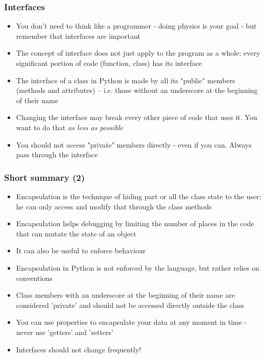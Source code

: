 \documentclass[9pt]{beamer}
\begin{document}
 
\begin{frame}
  \frametitle{Interfaces}
    
  \begin{itemize}
    \item You don't need to think like a programmer - doing physics is your goal - but
          remember that \alert{interfaces are important}
    \medskip
    \item The concept of interface does not just apply to the program as a whole:
          every significant portion of code (function, class) has its interface
    \medskip
    \item The interface of a class in Python is made by all its "public" members (methods and attributes)
          -- i.e. those without an underscore at the beginning of their name
    \medskip
    \item Changing the interface may break every other piece of code that uses it.
          You want to do that \emph{as less as possible}
    \medskip
    \item You should not access "private" members directly - even if you can. Always
          pass through the interface
    
  \end{itemize}

\end{frame}


\begin{frame}
  \frametitle{Short summary (2)}
    
  \begin{itemize}
    \small
    \item Encapsulation is the technique of hiding part or all the class state to the user; 
          he can only access and modify that through the class methods
    \medskip
    \item Encapsulation helps debugging by limiting the number of places in the code
          that can mutate the state of an object
    \medskip
    \item It can also be useful to enforce behaviour  
    \medskip
    \item Encapsulation in Python is not enforced by the language, but rather relies on conventions
    \medskip
    \item Class members with an underscore at the beginning of their name are
          considered 'private' and should not be accessed directly outside the class
    \smallskip
    \item You can use properties to encapsulate your data at any moment in time - never use 'getters' and 'setters'
    \medskip
    \item Interfaces should not change frequently!
  \end{itemize}
  
\end{frame}
\end{document}
